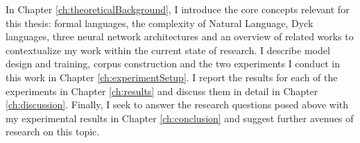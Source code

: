 In Chapter \ref{ch:theoreticalBackground}, I introduce the core concepts relevant for this thesis: formal languages, the complexity of Natural Language, Dyck languages, three neural network architectures and an overview of related works to contextualize my work within the current state of research. I describe model design and training, corpus construction and the two experiments I conduct in this work in Chapter \ref{ch:experimentSetup}. I report the results for each of the experiments in Chapter \ref{ch:results} and discuss them in detail in Chapter \ref{ch:discussion}. Finally, I seek to answer the research questions posed above with my experimental results in Chapter \ref{ch:conclusion} and suggest further avenues of research on this topic.